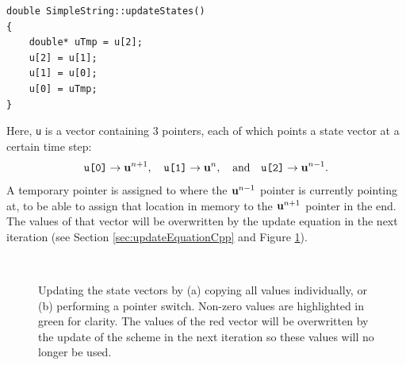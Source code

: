 \setlstCpp
\begin{lstlisting}[belowskip=-0.5\baselineskip]
double SimpleString::updateStates()
{
    double* uTmp = u[2];
    u[2] = u[1];
    u[1] = u[0];
    u[0] = uTmp;
}
\end{lstlisting}
Here, \texttt{u} is a vector containing 3 pointers, each of which points a state vector at a certain time step: 
\begin{equation}
    \texttt{u[0]} \rightarrow \mathbf{u}^{n+1}, \quad \texttt{u[1]} \rightarrow \mathbf{u}^{n}, \quad \text{and} \quad \texttt{u[2]} \rightarrow \mathbf{u}^{n-1}.
\end{equation}
A temporary pointer is assigned to where the $\mathbf{u}^{n-1}$ pointer is currently pointing at, to be able to assign that location in memory to the $\mathbf{u}^{n+1}$ pointer in the end. The values of that vector will be overwritten by the update equation in the next iteration (see Section \ref{sec:updateEquationCpp} and Figure \ref{fig:pointerSwitchFull}).

\begin{figure}[t]
    \centering
    \\
    \caption{Updating the state vectors by (a) copying all values individually, or (b) performing a pointer switch. Non-zero values are highlighted in green for clarity. The values of the red vector will be overwritten by the update of the scheme in the next iteration so these values will no longer be used.\label{fig:pointerSwitchFull}}
\end{figure}

